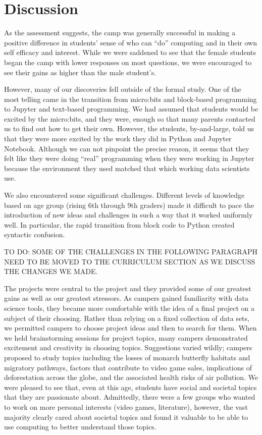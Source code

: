 \section{Discussion}

As the assessment suggests, the camp was generally successful in
making a positive difference in students' sense of who can ``do''
computing and in their own self efficacy and interest.  While we
were saddened to see that the female students began the camp with
lower responses on most questions, we were encouraged to see their
gains as higher than the male student's.

However, many of our discoveries fell outside of the formal study.
One of the most telling came in the transition from micro:bits and
block-based programming to Jupyter and text-based programming.  We
had assumed that students would be excited by the micro:bits, and
they were, enough so that many parents contacted us to find out how
to get their own.  However, the students, by-and-large, told us
that they were more excited by the work they did in Python and
Jupyter Notebook.  Although we can not pinpoint the precise reason,
it seems that they felt like they were doing ``real'' programming
when they were working in Jupyter because the environment they used
matched that which working data scientists use.

We also encountered some significant challenges.  Different levels
of knowledge based on age group (rising 6th through 9th graders)
made it difficult to pace the introduction of new ideas and challenges
in such a way that it worked uniformly well.  In particular, the
rapid transition from block code to Python created syntactic
confusion.

TO DO: SOME OF THE CHALLENGES IN THE FOLLOWING PARAGRAPH NEED TO BE
MOVED TO THE CURRICULUM SECTION AS WE DISCUSS THE CHANGES WE MADE.

The projects were central to the project and they provided some of
our greatest gains as well as our greatest stressors.
As campers gained familiarity with data science tools, they became
more comfortable with the idea of a final project on a subject of
their choosing. Rather than relying on a fixed collection of data
sets, we permitted campers to choose project ideas and then to
search for them.  When we held brainstorming sessions for project
topics, many campers demonstrated excitement and creativity in
choosing topics. Suggestions varied wildly; campers proposed to
study topics including the losses of monarch butterfly habitats and
migratory pathways, factors that contribute to video game sales,
implications of deforestation across the globe, and the associated
health risks of air pollution.  We were pleased to see that, even
at this age, students have social and societal topics that they are
passionate about.  Admittedly, there were a few groups who wanted
to work on more personal interests (video games, literature),
however, the vast majority clearly cared about societal topics and
found it valuable to be able to use computing to better understand
those topics.


